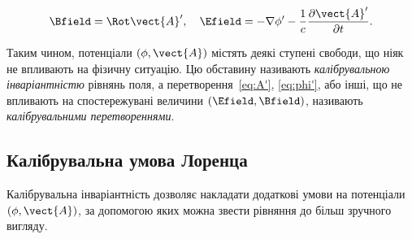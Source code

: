 \begin{equation}
	\Bfield = \Rot \vect{A}', \quad
	\Efield = -\nabla \phi' - \frac{1}{c} \frac{\partial \vect{A}'}{\partial t}.
\end{equation}

Таким чином, потенціали $(\phi, \vect{A})$ містять деякі ступені свободи, що ніяк не впливають на фізичну ситуацію. Цю
обставину називають \emph{калібрувальною інваріантністю} рівнянь поля, а перетворення~\eqref{eq:A'}, \eqref{eq:phi'},
або інші, що не впливають на спостережувані величини $(\Efield, \Bfield)$, називають \emph{калібрувальними
перетвореннями}.


\subsection*{Калібрувальна умова Лоренца}



Калібрувальна інваріантність дозволяє накладати додаткові умови на потенціали $(\phi, \vect{A})$, за допомогою яких
можна звести рівняння до більш зручного вигляду.

